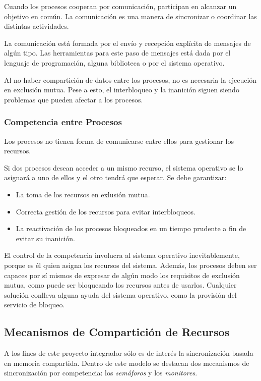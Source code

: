 Cuando los procesos cooperan por comunicación, participan en alcanzar un
objetivo en común. La comunicación es una manera de sincronizar o coordinar las
distintas actividades.

La comunicación está formada por el envío y recepción explícita de mensajes de
algún tipo. Las herramientas para este paso de mensajes está dada por el
lenguaje de programación, alguna biblioteca o por el sistema operativo.

Al no haber compartición de datos entre los procesos, no es necesaria la
ejecución en exclusión mutua. Pese a esto, el interbloqueo y la inanición siguen
siendo problemas que pueden afectar a los procesos.\cite{SistOpStallings}

\subsubsection{Competencia entre Procesos}

Los procesos no tienen forma de comunicarse entre ellos para gestionar los
recursos.

Si dos procesos desean acceder a un mismo recurso, el sistema operativo se lo
asignará a uno de ellos y el otro tendrá que esperar. Se debe garantizar:
\begin{itemize}
    \item La toma de los recursos en exlusión mutua.
    \item Correcta gestión de los recursos para evitar interbloqueos.
    \item La reactivación de los procesos bloqueados en un tiempo prudente a fin de evitar su inanición.
\end{itemize}
El control de la competencia involucra al sistema operativo
inevitablemente, porque es él quien asigna los recursos del sistema.
Además, los procesos deben ser capaces por sí mismos de expresar de algún
modo los requisitos de exclusión mutua, como puede ser bloqueando los
recursos antes de usarlos. Cualquier solución conlleva alguna ayuda del
sistema operativo, como la provisión del servicio de
bloqueo.\cite{SistOpStallings}


\subsection{Mecanismos de Compartición de Recursos}

A los fines de este proyecto integrador sólo es de interés la sincronización
basada en memoria compartida. Dentro de este modelo se destacan dos mecanismos
de sincronización por competencia: los \textit{semáforos} y los \textit{monitores}.

